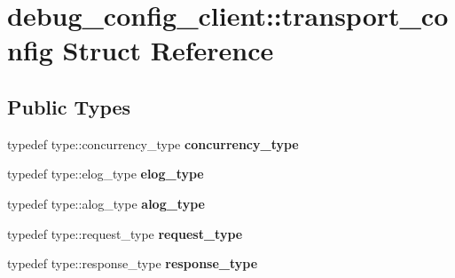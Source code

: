 \hypertarget{structdebug__config__client_1_1transport__config}{}\section{debug\+\_\+config\+\_\+client\+:\+:transport\+\_\+config Struct Reference}
\label{structdebug__config__client_1_1transport__config}
\subsection*{Public Types}
\begin{DoxyCompactItemize}
\item 
typedef type\+::concurrency\+\_\+type {\bfseries concurrency\+\_\+type}\hypertarget{structdebug__config__client_1_1transport__config_add8b23c69a9f263affc779a55491f36a}{}\label{structdebug__config__client_1_1transport__config_add8b23c69a9f263affc779a55491f36a}

\item 
typedef type\+::elog\+\_\+type {\bfseries elog\+\_\+type}\hypertarget{structdebug__config__client_1_1transport__config_a45a5ad533dadb37ec3e6a3c76f0ed6b3}{}\label{structdebug__config__client_1_1transport__config_a45a5ad533dadb37ec3e6a3c76f0ed6b3}

\item 
typedef type\+::alog\+\_\+type {\bfseries alog\+\_\+type}\hypertarget{structdebug__config__client_1_1transport__config_a6c713b8f7f93d8622c7536b7c72656e1}{}\label{structdebug__config__client_1_1transport__config_a6c713b8f7f93d8622c7536b7c72656e1}

\item 
typedef type\+::request\+\_\+type {\bfseries request\+\_\+type}\hypertarget{structdebug__config__client_1_1transport__config_a5c1f1f03a8724347f47432609aad533a}{}\label{structdebug__config__client_1_1transport__config_a5c1f1f03a8724347f47432609aad533a}

\item 
typedef type\+::response\+\_\+type {\bfseries response\+\_\+type}\hypertarget{structdebug__config__client_1_1transport__config_a814f5a7e882ba6a20c593df74682ad4b}{}\label{structdebug__config__client_1_1transport__config_a814f5a7e882ba6a20c593df74682ad4b}

\end{DoxyCompactItemize}
